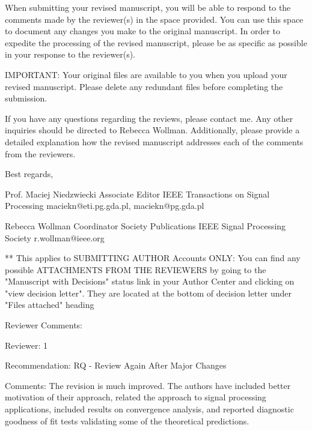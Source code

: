 When submitting your revised manuscript, you will be able to respond
to the comments made by the reviewer(s) in the space provided.  You
can use this space to document any changes you make to the original
manuscript.  In order to expedite the processing of the revised
manuscript, please be as specific as possible in your response to the
reviewer(s).

IMPORTANT: Your original files are available to you when you upload
your revised manuscript.  Please delete any redundant files before
completing the submission.

If you have any questions regarding the reviews, please contact me.
Any other inquiries should be directed to Rebecca Wollman.
Additionally, please provide a detailed explanation how the revised
manuscript addresses each of the comments from the reviewers.

Best regards,

Prof. Maciej Niedzwiecki
Associate Editor
IEEE Transactions on Signal Processing
maciekn@eti.pg.gda.pl, maciekn@pg.gda.pl

Rebecca Wollman
Coordinator Society Publications
IEEE Signal Processing Society
r.wollman@ieee.org

** {This applies to SUBMITTING AUTHOR Accounts ONLY: You can find any
  possible ATTACHMENTS FROM THE REVIEWERS by going to the "Manuscript
  with Decisions" status link in your Author Center and clicking on
  "view decision letter". They are located at the bottom of decision
  letter under "Files attached" heading}

Reviewer Comments:

Reviewer: 1

Recommendation: RQ - Review Again After Major Changes

Comments: The revision is much improved. The authors have included
better motivation of their approach, related the approach to signal
processing applications, included results on convergence analysis, and
reported diagnostic goodness of fit tests validating some of the
theoretical predictions.

